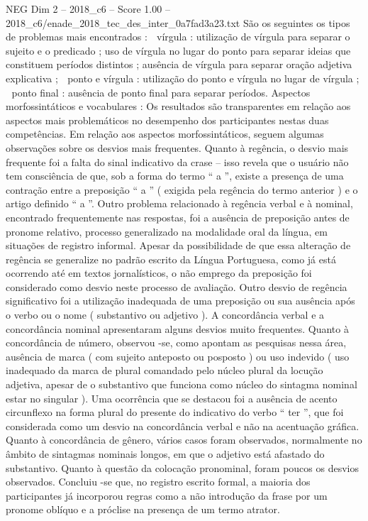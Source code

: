 \begin{textsample}{NEG Dim 2 – 2018\_c6 – Score 1.00 – 2018\_c6/enade\_2018\_tec\_des\_inter\_0a7fad3a23.txt}
São os seguintes os tipos de problemas mais encontrados :  vírgula : utilização de vírgula para separar o sujeito e o predicado ; uso de vírgula no lugar do ponto para separar ideias que constituem períodos distintos ; ausência de vírgula para separar oração adjetiva explicativa ;  ponto e vírgula : utilização do ponto e vírgula no lugar de vírgula ;  ponto final : ausência de ponto final para separar períodos.
Aspectos morfossintáticos e vocabulares : Os resultados são transparentes em relação aos aspectos mais problemáticos no desempenho dos participantes nestas duas competências.
Em relação aos aspectos morfossintáticos, seguem algumas observações sobre os desvios mais frequentes.
Quanto à regência, o desvio mais frequente foi a falta do sinal indicativo da crase – isso revela que o usuário não tem consciência de que, sob a forma do termo “ a ”, existe a presença de uma contração entre a preposição “ a ” ( exigida pela regência do termo anterior ) e o artigo definido “ a ”.
Outro problema relacionado à regência verbal e à nominal, encontrado frequentemente nas respostas, foi a ausência de preposição antes de pronome relativo, processo generalizado na modalidade oral da língua, em situações de registro informal.
Apesar da possibilidade de que essa alteração de regência se generalize no padrão escrito da Língua Portuguesa, como já está ocorrendo até em textos jornalísticos, o não emprego da preposição foi considerado como desvio neste processo de avaliação.
Outro desvio de regência significativo foi a utilização inadequada de uma preposição ou sua ausência após o verbo ou o nome ( substantivo ou adjetivo ).
A concordância verbal e a concordância nominal apresentaram alguns desvios muito frequentes.
Quanto à concordância de número, observou -se, como apontam as pesquisas nessa área, ausência de marca ( com sujeito anteposto ou posposto ) ou uso indevido ( uso inadequado da marca de plural comandado pelo núcleo plural da locução adjetiva, apesar de o substantivo que funciona como núcleo do sintagma nominal estar no singular ).
Uma ocorrência que se destacou foi a ausência de acento circunflexo na forma plural do presente do indicativo do verbo “ ter ”, que foi considerada como um desvio na concordância verbal e não na acentuação gráfica.
Quanto à concordância de gênero, vários casos foram observados, normalmente no âmbito de sintagmas nominais longos, em que o adjetivo está afastado do substantivo.
Quanto à questão da colocação pronominal, foram poucos os desvios observados.
Concluiu -se que, no registro escrito formal, a maioria dos participantes já incorporou regras como a não introdução da frase por um pronome oblíquo e a próclise na presença de um termo atrator.

\end{textsample}
